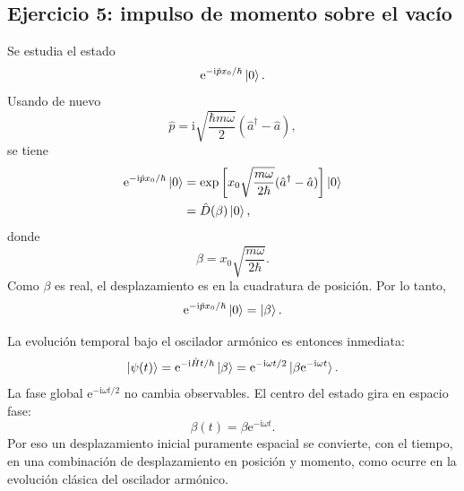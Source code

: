 \documentclass[11pt]{article}
\newcommand{\ii}{\mathrm{i}}
\newcommand{\ee}{\mathrm{e}}
\newcommand{\adag}{\hat a^\dagger}
\begin{document}
\subsection*{Ejercicio 5: impulso de momento sobre el vac\'io}

Se estudia el estado
\begin{equation}
  \ee^{-\ii\hat p x_0/\hbar}\ket0.
\end{equation}
Usando de nuevo
\begin{equation}
  \hat p=\ii\sqrt{\frac{\hbar m\omega}{2}}(\adag-\hat a),
\end{equation}
se tiene
\begin{align}
  \ee^{-\ii\hat p x_0/\hbar}\ket0
  &=
  \exp\left[
  x_0\sqrt{\frac{m\omega}{2\hbar}}(\adag-\hat a)
  \right]\ket0\\
  &=
  \hat D(\beta)\ket0,
\end{align}
donde
\begin{equation}
  \boxed{
  \beta=x_0\sqrt{\frac{m\omega}{2\hbar}}.
  }
\end{equation}
Como $\beta$ es real, el desplazamiento es en la cuadratura de posici\'on. Por
lo tanto,
\begin{equation}
  \ee^{-\ii\hat p x_0/\hbar}\ket0=\ket\beta.
\end{equation}

La evoluci\'on temporal bajo el oscilador arm\'onico es entonces inmediata:
\begin{equation}
  \ket{\psi(t)}
  =
  \ee^{-\ii\hat Ht/\hbar}\ket\beta
  =
  \ee^{-\ii\omega t/2}\ket{\beta\ee^{-\ii\omega t}}.
\end{equation}
La fase global $\ee^{-\ii\omega t/2}$ no cambia observables. El centro del
estado gira en espacio fase:
\begin{equation}
  \beta(t)=\beta\ee^{-\ii\omega t}.
\end{equation}
Por eso un desplazamiento inicial puramente espacial se convierte, con el
tiempo, en una combinaci\'on de desplazamiento en posici\'on y momento, como
ocurre en la evoluci\'on cl\'asica del oscilador arm\'onico.
\end{document}
